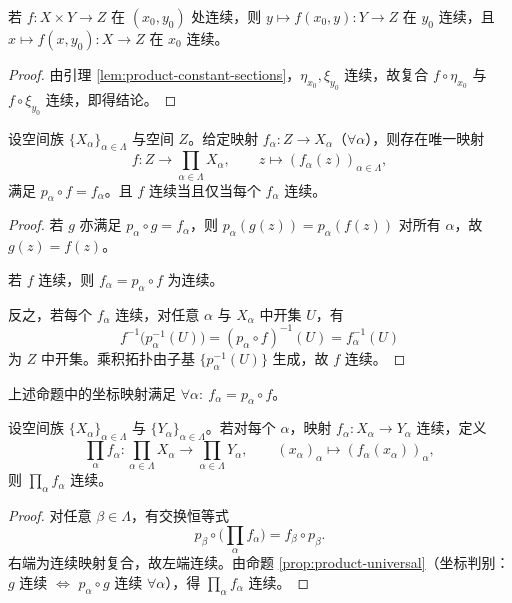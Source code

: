 \documentclass[lang=cn,a4paper,newtx,figureplace=section,tableplace=section]{elegantbook}
\begin{document}
 \begin{corollary}[联合连续蕴含偏连续]\label{cor:partial-continuity}
  若 $f:X\times Y\to Z$ 在 $(x_0,y_0)$ 处连续，则
  $y\mapsto f(x_0,y):Y\to Z$ 在 $y_0$ 连续，且 $x\mapsto f(x,y_0):X\to Z$ 在 $x_0$ 连续。
 \end{corollary}
 \begin{proof}
  由引理 \ref{lem:product-constant-sections}，$\eta_{x_0},\xi_{y_0}$ 连续，故复合 $f\circ\eta_{x_0}$ 与 $f\circ\xi_{y_0}$ 连续，即得结论。
 \end{proof}
 
 \begin{proposition}\label{prop:product-universal}
  设空间族 $\{X_\alpha\}_{\alpha\in\Lambda}$ 与空间 $Z$。给定映射 $f_\alpha:Z\to X_\alpha$（$\forall\alpha$），则存在唯一映射
  \[
   f: Z\to\prod_{\alpha\in\Lambda} X_\alpha,\qquad z\mapsto (f_\alpha(z))_{\alpha\in\Lambda},
  \]
  满足 $p_\alpha\circ f=f_\alpha$。且 $f$ 连续当且仅当每个 $f_\alpha$ 连续。
 \end{proposition}
 \begin{proof}
  若 $g$ 亦满足 $p_\alpha\circ g=f_\alpha$，则 $p_\alpha(g(z))=p_\alpha(f(z))$ 对所有 $\alpha$，故 $g(z)=f(z)$。
  
  若 $f$ 连续，则 $f_\alpha=p_\alpha\circ f$ 为连续。
  
  反之，若每个 $f_\alpha$ 连续，对任意 $\alpha$ 与 $X_\alpha$ 中开集 $U$，有
  \[
   f^{-1}\big(p_\alpha^{-1}(U)\big)=(p_\alpha\circ f)^{-1}(U)=f_\alpha^{-1}(U)
  \]
  为 $Z$ 中开集。乘积拓扑由子基 $\{p_\alpha^{-1}(U)\}$ 生成，故 $f$ 连续。
 \end{proof}
 
 \begin{remark}
  上述命题中的坐标映射满足 $\forall\alpha:\ f_\alpha=p_\alpha\circ f$。
 \end{remark}
 
 \begin{proposition}[坐标连续推出乘积映射连续]\label{prop:product-map-continuous}
  设空间族 $\{X_\alpha\}_{\alpha\in\Lambda}$ 与 $\{Y_\alpha\}_{\alpha\in\Lambda}$。若对每个 $\alpha$，映射 $f_\alpha:X_\alpha\to Y_\alpha$ 连续，定义
  \[
   \prod_{\alpha} f_\alpha: \prod_{\alpha\in\Lambda} X_\alpha\longrightarrow \prod_{\alpha\in\Lambda} Y_\alpha,\qquad (x_\alpha)_{\alpha}\mapsto (f_\alpha(x_\alpha))_{\alpha},
  \]
  则 $\prod_{\alpha} f_\alpha$ 连续。
 \end{proposition}
 \begin{proof}
  对任意 $\beta\in\Lambda$，有交换恒等式
  \[
   p_\beta\circ\Big(\prod_{\alpha} f_\alpha\Big)= f_\beta\circ p_\beta.
  \]
  右端为连续映射复合，故左端连续。由命题 \ref{prop:product-universal}（坐标判别：$g$ 连续 $\iff$ $p_\alpha\circ g$ 连续 $\forall\alpha$），得 $\prod_{\alpha} f_\alpha$ 连续。
 \end{proof}
 
\end{document}
